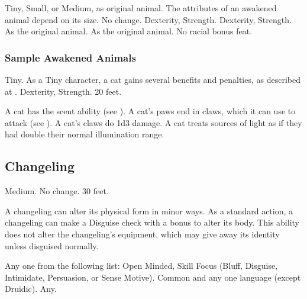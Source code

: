          Tiny, Small, or Medium, as original animal.
         The attributes of an awakened animal depend on its size.
         No change.
          Dexterity,  Strength.
          Dexterity,  Strength.
         As the original animal.
         As the original animal.
         No racial bonus feat.

        \subsubsection{Sample Awakened Animals}


             Tiny. As a Tiny character, a cat gains several benefits and penalties, as described at .
              Dexterity,  Strength.
             20 feet.
            \begin{itemize}
                 A cat has the scent ability (see ).
                 A cat's paws end in claws, which it can use to attack (see ). A cat's claws do 1d3 damage.
                 A cat treats sources of light as if they had double their normal illumination range.
            \end{itemize}

        \subsection{Changeling}

             Medium.
             No change.
             30 feet.
            \begin{itemize}
                 A changeling can alter its physical form in minor ways. As a standard action, a changeling can make a Disguise check with a  bonus to alter its body. This ability does not alter the changeling's equipment, which may give away its identity unless disguised normally.
            \end{itemize}
             Any one from the following list: Open Minded, Skill Focus (Bluff, Disguise, Intimidate, Persuasion, or Sense Motive).
             Common and any one language (except Druidic).
             Any.

